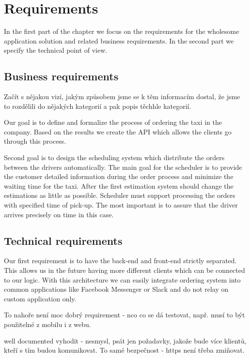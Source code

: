 \chapter{Requirements}
In the first part of the chapter we focus on the requirements for the wholesome application solution and related business requirements. In the second part we specify the technical point of view.

\section{Business requirements}
Začít s nějakou vizí, jakým způsobem jsme se k těm informacím dostal, že jsme to rozdělili do nějakých kategorií a pak popis těchhle kategorií.



Our goal is to define and formalize the process of ordering the taxi in the company. Based on the results we create the API which allows the clients go through this process. 

Second goal is to design the scheduling system which distribute the orders between the drivers automatically. The main goal for the scheduler is to provide the customer detailed information during the order process and minimize the waiting time for the taxi. After the first estimation system should change the estimations as little as possible. Scheduler must support processing the orders with specified time of pick-up. The most important is to assure that the driver arrives precisely on time in this case.

\section{Technical requirements}
	Our first requirement is to have the back-end and front-end strictly separated. This allows us in the future having more different clients which can be connected to our logic. With this architecture we can easily integrate ordering system into common applications like Facebook Messenger or Slack and do not relay on custom application only.
	
	To nahoře není moc dobrý requirement - nco co se dá testovat, např. musí to být použitelné z mobilu i z webu.
	
	well documented vyhodit - nesmysl, psát jen požadavky, jakože bude více klientů, kteří s tím budou komunikovat. To samé bezpečnost - https není třeba zmiňovat.
	
